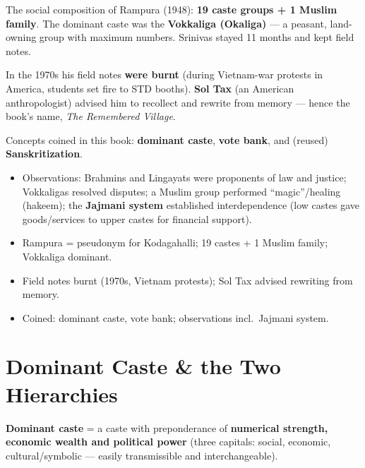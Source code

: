 \begin{DataFact}
The social composition of Rampura (1948): \textbf{19 caste groups + 1 Muslim family}. The dominant caste was the \textbf{Vokkaliga (Okaliga)} --- a peasant, land-owning group with maximum numbers. Srinivas stayed 11 months and kept field notes.
\end{DataFact}

\begin{ExampleBox}
In the 1970s his field notes \textbf{were burnt} (during Vietnam-war protests in America, students set fire to STD booths). \textbf{Sol Tax} (an American anthropologist) advised him to recollect and rewrite from memory --- hence the book's name, \emph{The Remembered Village}.
\end{ExampleBox}

Concepts coined in this book: \textbf{dominant caste}, \textbf{vote bank}, and (reused) \textbf{Sanskritization}.

\begin{itemize}
\item Observations: Brahmins and Lingayats were proponents of law and justice; Vokkaligas resolved disputes; a Muslim group performed ``magic''/healing (hakeem); the \textbf{Jajmani system} established interdependence (low castes gave goods/services to upper castes for financial support).
\end{itemize}

\begin{QuickRevision}
\begin{itemize}
\item Rampura = pseudonym for Kodagahalli; 19 castes + 1 Muslim family; Vokkaliga dominant.
\item Field notes burnt (1970s, Vietnam protests); Sol Tax advised rewriting from memory.
\item Coined: dominant caste, vote bank; observations incl.\ Jajmani system.
\end{itemize}
\end{QuickRevision}

\section{Dominant Caste \& the Two Hierarchies}

\begin{KeyConcept}
\textbf{Dominant caste} = a caste with preponderance of \textbf{numerical strength, economic wealth and political power} (three capitals: social, economic, cultural/symbolic --- easily transmissible and interchangeable).
\end{KeyConcept}


